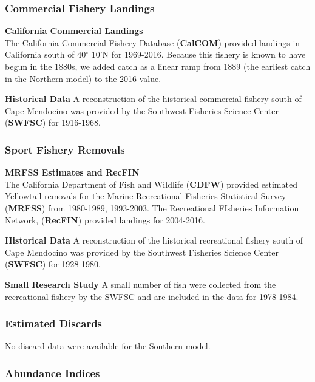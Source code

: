 \documentclass[12pt,]{article}
\begin{document}
\subsubsection{Commercial Fishery
Landings}\label{commercial-fishery-landings-1}

\textbf{California Commercial Landings}\\
The California Commercial Fishery Database (\textbf{CalCOM}) provided
landings in California south of 40\(^\circ\) 10'N for 1969-2016. Because
this fishery is known to have begun in the 1880s, we added catch as a
linear ramp from 1889 (the earliest catch in the Northern model) to the
2016 value.

\textbf{Historical Data} A reconstruction of the historical commercial
fishery south of Cape Mendocino was provided by the Southwest Fisheries
Science Center (\textbf{SWFSC}) for 1916-1968.

\subsubsection{Sport Fishery Removals}\label{sport-fishery-removals-1}

\textbf{MRFSS Estimates and RecFIN}\\
The California Department of Fish and Wildlife (\textbf{CDFW}) provided
estimated Yellowtail removals for the Marine Recreational Fisheries
Statistical Survey (\textbf{MRFSS}) from 1980-1989, 1993-2003. The
Recreational FIsheries Information Network, (\textbf{RecFIN}) provided
landings for 2004-2016.

\textbf{Historical Data} A reconstruction of the historical recreational
fishery south of Cape Mendocino was provided by the Southwest Fisheries
Science Center (\textbf{SWFSC}) for 1928-1980.

\textbf{Small Research Study} A small number of fish were collected from
the recreational fishery by the SWFSC and are included in the data for
1978-1984.

\subsubsection{Estimated Discards}\label{estimated-discards-1}

No discard data were available for the Southern model.

\subsubsection{Abundance Indices}\label{abundance-indices-1}
\end{document}
